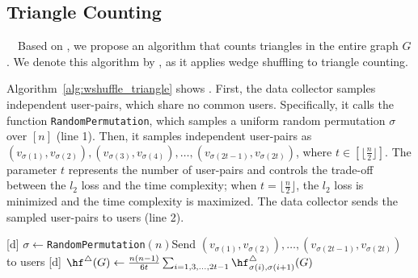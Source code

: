 \subsection{Triangle Counting}
\label{sub:triangle}
~~Based on 
\AlgWSLE{}, 
we propose an algorithm that counts triangles in the entire graph $G$. 
We denote this algorithm by \AlgWSTri{}, as it applies wedge shuffling to triangle counting. 

Algorithm~\ref{alg:wshuffle_triangle} shows \AlgWSTri{}. 
First, the data collector samples independent user-pairs, which share no common users. 
Specifically, it calls the function \texttt{RandomPermutation}, which samples a uniform random permutation $\sigma$ over $[n]$ (line 1). 
Then, it samples independent user-pairs as 
$(v_{\sigma(1)}, v_{\sigma(2)}), (v_{\sigma(3)}, v_{\sigma(4)}), \ldots, (v_{\sigma(2t-1)}, v_{\sigma(2t)})$, where $t \in [\lfloor \frac{n}{2} \rfloor]$. 
The parameter $t$ represents the number of user-pairs and controls the trade-off between the $l_2$ loss and the time complexity; 
when $t = \lfloor \frac{n}{2} \rfloor$, the $l_2$ loss is minimized and the time complexity is maximized. 
The data collector sends the sampled user-pairs to users (line 2).

\setlength{\algomargin}{5mm}
\begin{algorithm}[t]
  \SetAlgoLined
  [d] $\sigma \leftarrow$\texttt{RandomPermutation}$(n)$\;
  [d] Send $(v_{\sigma(1)}, v_{\sigma(2)}), \ldots, (v_{\sigma(2t-1)}, v_{\sigma(2t)})$ to users\;
  [d] $\hf^\triangle(G) \leftarrow \frac{n(n-1)}{6t} \sum_{i=1, 3, \ldots, 2t-1} \hf_{\sigma(i),\sigma(i+1)}^\triangle(G)$\;
  \caption{Our triangle counting algorithm \AlgWSTri{}. 
  \AlgWSLE{} is shown in Algorithm~\ref{alg:WSLE}. 
  }\label{alg:wshuffle_triangle}
\end{algorithm}

